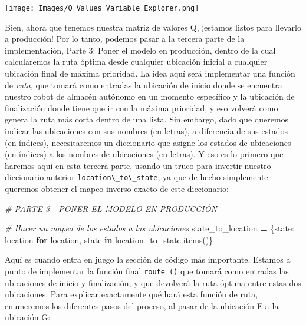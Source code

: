 \documentclass[
]{book}
\newenvironment{Shaded}{\begin{snugshade}}{\end{snugshade}}
\newcommand{\CommentTok}[1]{\textcolor[rgb]{0.56,0.35,0.01}{\textit{#1}}}
\newcommand{\ControlFlowTok}[1]{\textcolor[rgb]{0.13,0.29,0.53}{\textbf{#1}}}
\newcommand{\KeywordTok}[1]{\textcolor[rgb]{0.13,0.29,0.53}{\textbf{#1}}}
\newcommand{\NormalTok}[1]{#1}
\newcommand{\OperatorTok}[1]{\textcolor[rgb]{0.81,0.36,0.00}{\textbf{#1}}}
\begin{document}
\texttt{[image: Images/Q\_Values\_Variable\_Explorer.png]}

Bien, ahora que tenemos nuestra matriz de valores Q, ¡estamos listos para llevarlo a producción! Por lo tanto, podemos pasar a la tercera parte de la implementación, Parte 3: Poner el modelo en producción, dentro de la cual calcularemos la ruta óptima desde cualquier ubicación inicial a cualquier ubicación final de máxima prioridad. La idea aquí será implementar una función de \emph{ruta}, que tomará como entradas la ubicación de inicio donde se encuentra nuestro robot de almacén autónomo en un momento específico y la ubicación de finalización donde tiene que ir con la máxima prioridad, y eso volverá como genera la ruta más corta dentro de una lista. Sin embargo, dado que queremos indicar las ubicaciones con sus nombres (en letras), a diferencia de sus estados (en índices), necesitaremos un diccionario que asigne los estados de ubicaciones (en índices) a los nombres de ubicaciones (en letras). Y eso es lo primero que haremos aquí en esta tercera parte, usando un truco para invertir nuestro diccionario anterior \texttt{location\textbackslash{}\_to\textbackslash{}\_state}, ya que de hecho simplemente queremos obtener el mapeo inverso exacto de este diccionario:

\begin{Shaded}
\begin{Highlighting}[]
\CommentTok{\# PARTE 3 {-} PONER EL MODELO EN PRODUCCIÓN}

\CommentTok{\# Hacer un mapeo de los estados a las ubicaciones}
\NormalTok{state\_to\_location }\OperatorTok{=}\NormalTok{ \{state: location }
                      \ControlFlowTok{for}\NormalTok{ location, state }\KeywordTok{in}\NormalTok{ location\_to\_state.items()\}}
\end{Highlighting}
\end{Shaded}

Aquí es cuando entra en juego la sección de código más importante. Estamos a punto de implementar la función final \texttt{route\ ()} que tomará como entradas las ubicaciones de inicio y finalización, y que devolverá la ruta óptima entre estas dos ubicaciones. Para explicar exactamente qué hará esta función de ruta, enumeremos los diferentes pasos del proceso, al pasar de la ubicación E a la ubicación G:
\end{document}
